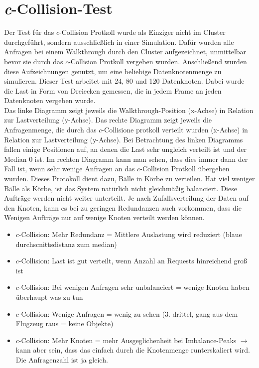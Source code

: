 \begin{Bild}

\end{Bild}

\begin{Bild}

\end{Bild}

\section{\textit{c}-Collision-Test}
\label{sec:eval:ccollision}

Der Test für das $c$-Collision Protkoll wurde als Einziger nicht im Cluster durchgeführt, sondern ausschließlich in einer Simulation. Dafür wurden alle Anfragen bei einem Walkthrough durch den Cluster aufgezeichnet, unmittelbar bevor sie durch das $c$-Collision Protkoll vergeben wurden. Anschließend wurden diese Aufzeichnungen genutzt, um eine beliebige Datenknotenmenge zu simulieren. Dieser Test arbeitet mit 24, 80 und 120 Datenknoten. Dabei wurde die Last in Form von Dreiecken gemessen, die in jedem Frame an jeden Datenknoten vergeben wurde.\\
Das linke Diagramm zeigt jeweils die Walkthrough-Position (x-Achse) in Relation zur Lastverteilung (y-Achse). Das rechte Diagramm zeigt jeweils die Anfragenmenge, die durch das $c$-Collisione protkoll verteilt wurden (x-Achse) in Relation zur Lastverteilung (y-Achse). Bei Betrachtung des linken Diagramms fallen einige Positionen auf, an denen die Last sehr ungleich verteilt ist und der Median 0 ist. Im rechten Diagramm kann man sehen, dass dies immer dann der Fall ist, wenn sehr wenige Anfragen an das $c$-Collision Protkoll übergeben wurden. Dieses Protokoll dient dazu, Bälle in Körbe zu verteilen. Hat viel weniger Bälle als Körbe, ist das System natürlich nicht gleichmäßig balanciert. Diese Aufträge werden nicht weiter unterteilt. Je nach Zufallsverteilung der Daten auf den Knoten, kann es bei zu geringen Redundanzen auch vorkommen, dass die Wenigen Aufträge nur auf wenige Knoten verteilt werden können.

\begin{itemize}
\item $c$-Collision: Mehr Redundanz = Mittlere Auslastung wird reduziert (blaue durchscnittsdistanz zum median)
\item $c$-Collision: Last ist gut verteilt, wenn Anzahl an Requests hinreichend groß ist
\item $c$-Collision: Bei wenigen Anfragen sehr unbalanciert = wenige Knoten haben überhaupt was zu tun
\item $c$-Collision: Wenige Anfragen = wenig zu sehen (3. drittel, gang aus dem Flugzeug raus = keine Objekte)
\item $c$-Collision: Mehr Knoten = mehr Ausgeglichenheit bei Imbalance-Peaks $\rightarrow$ kann aber sein, dass das einfach durch die Knotenmenge runterskaliert wird. Die Anfragenzahl ist ja gleich.
\end{itemize}

